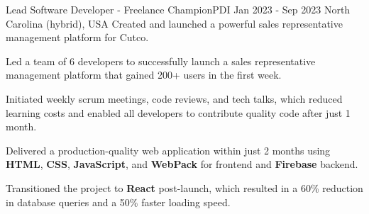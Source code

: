 
\begin{cventries}
  \cventry
    {Lead Software Developer - Freelance} %
    {ChampionPDI} %
    {Jan 2023 - Sep 2023} %
    {North Carolina (hybrid), USA} %
    {Created and launched a powerful sales representative management platform for Cutco.}
    {
      \begin{cvitems} %
        \item {Led a team of 6 developers to successfully launch a sales representative management platform that gained 200+ users in the first week.}
        \item {Initiated weekly scrum meetings, code reviews, and tech talks, which reduced learning costs and enabled all developers to contribute quality code after just 1 month.}
        \item {Delivered a production-quality web application within just 2 months using \textbf{HTML}, \textbf{CSS}, \textbf{JavaScript}, and \textbf{WebPack} for frontend and \textbf{Firebase} backend.}
        \item {Transitioned the project to \textbf{React} post-launch, which resulted in a 60\% reduction in database queries and a 50\% faster loading speed.}
      \end{cvitems}
    }


\end{cventries}
